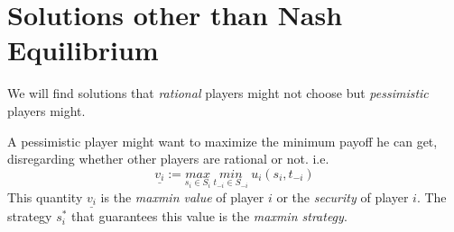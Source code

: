 \section{Solutions other than Nash Equilibrium}
We will find solutions that \textit{rational} players might not choose but \textit{pessimistic} players might.

A pessimistic player might want to maximize the minimum payoff he can get, disregarding whether other players are rational or not. i.e. 
\[
	\underline{v_i} := \underset{s_i \in S_i}{max}~\underset{t_{-i} \in S_{-i}}{min}~u_i(s_i, t_{-i})
\]
This quantity $\underline{v_i}$ is the \textit{maxmin value} of player $i$ or the \textit{security} of player $i$. The strategy $s_i^*$ that guarantees this value is the \textit{maxmin strategy}.